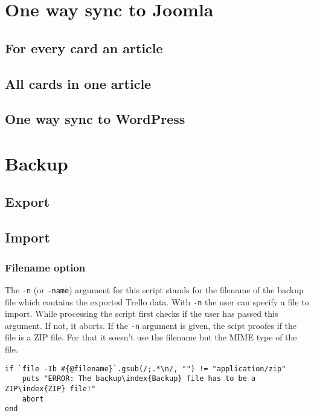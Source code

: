 \section{One way sync to Joomla}

\subsection{For every card an article}

\subsection{All cards in one article}

\subsection{One way sync to WordPress}

\section{Backup}

\subsection{Export}

\subsection{Import}

\subsubsection{Filename option}
The \texttt{-n} (or \texttt{-name}) argument for this script stands for the filename of the backup file which contains the  exported Trello data. With \texttt{-n} the user can specify a file to import. While processing the script first checks if the user has passed this argument. If not, it aborts. If the \texttt{-n} argument is given, the scipt proofes if the file is a ZIP file. For that it soesn't use the filename but the MIME type of the file.

\begin{lstlisting}[float=htb, caption=Checking if the file has the MIME type \textquotedblleft application/zip\textquotedblright, label=listing008]
if `file -Ib #{@filename}`.gsub(/;.*\n/, "") != "application/zip"
	puts "ERROR: The backup\index{Backup} file has to be a ZIP\index{ZIP} file!"
	abort
end
\end{lstlisting}

